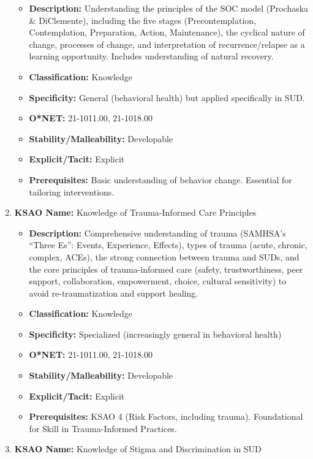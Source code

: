 \documentclass[
  letterpaper,
  DIV=11,
  numbers=noendperiod]{scrartcl}
\providecommand{\tightlist}{%
  \setlength{\itemsep}{0pt}\setlength{\parskip}{0pt}}
\begin{document}
\begin{enumerate}
  \begin{itemize}
  \tightlist
  \item
    \textbf{Description:} Understanding the principles of the SOC model
    (Prochaska \& DiClemente), including the five stages
    (Precontemplation, Contemplation, Preparation, Action, Maintenance),
    the cyclical nature of change, processes of change, and
    interpretation of recurrence/relapse as a learning opportunity.
    Includes understanding of natural recovery.
  \item
    \textbf{Classification:} Knowledge
  \item
    \textbf{Specificity:} General (behavioral health) but applied
    specifically in SUD.
  \item
    \textbf{O*NET:} 21-1011.00, 21-1018.00
  \item
    \textbf{Stability/Malleability:} Developable
  \item
    \textbf{Explicit/Tacit:} Explicit
  \item
    \textbf{Prerequisites:} Basic understanding of behavior change.
    Essential for tailoring interventions.
  \end{itemize}
\item
  \textbf{KSAO Name:} Knowledge of Trauma-Informed Care Principles

  \begin{itemize}
  \tightlist
  \item
    \textbf{Description:} Comprehensive understanding of trauma
    (SAMHSA's ``Three Es'': Events, Experience, Effects), types of
    trauma (acute, chronic, complex, ACEs), the strong connection
    between trauma and SUDs, and the core principles of trauma-informed
    care (safety, trustworthiness, peer support, collaboration,
    empowerment, choice, cultural sensitivity) to avoid
    re-traumatization and support healing.
  \item
    \textbf{Classification:} Knowledge
  \item
    \textbf{Specificity:} Specialized (increasingly general in
    behavioral health)
  \item
    \textbf{O*NET:} 21-1011.00, 21-1018.00
  \item
    \textbf{Stability/Malleability:} Developable
  \item
    \textbf{Explicit/Tacit:} Explicit
  \item
    \textbf{Prerequisites:} KSAO 4 (Risk Factors, including trauma).
    Foundational for Skill in Trauma-Informed Practices.
  \end{itemize}
\item
  \textbf{KSAO Name:} Knowledge of Stigma and Discrimination in SUD


\end{enumerate}
\end{document}
